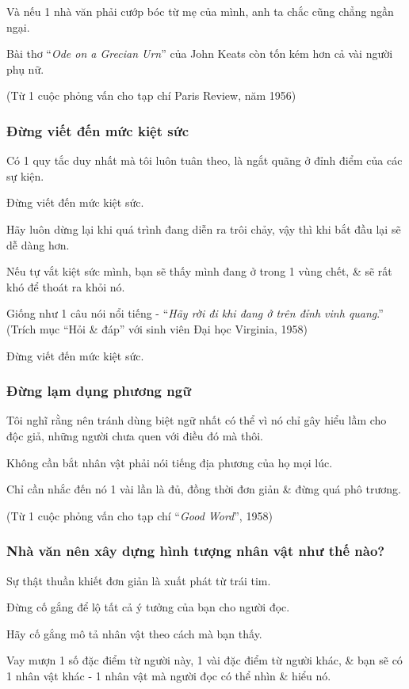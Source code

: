 \documentclass{article}
\begin{document}
Và nếu 1 nhà văn phải cướp bóc từ mẹ của mình, anh ta chắc cũng chẳng ngần ngại.

Bài thơ ``\textit{Ode on a Grecian Urn}'' của John Keats còn tốn kém hơn cả vài người phụ nữ.

(Từ 1 cuộc phỏng vấn cho tạp chí Paris Review, năm 1956)

\subsubsection{Đừng viết đến mức kiệt sức}
Có 1 quy tắc duy nhất mà tôi luôn tuân theo, là ngắt quãng ở đỉnh điểm của các sự kiện.

Đừng viết đến mức kiệt sức.

Hãy luôn dừng lại khi quá trình đang diễn ra trôi chảy, vậy thì khi bắt đầu lại sẽ dễ dàng hơn.

Nếu tự vắt kiệt sức mình, bạn sẽ thấy mình đang ở trong 1 vùng chết, \& sẽ rất khó để thoát ra khỏi nó.

Giống như 1 câu nói nổi tiếng - ``\textit{Hãy rời đi khi đang ở trên đỉnh vinh quang}.'' (Trích mục ``Hỏi \& đáp'' với sinh viên Đại học Virginia, 1958)

\textsf{Đừng viết đến mức kiệt sức.}

\subsubsection{Đừng lạm dụng phương ngữ}
Tôi nghĩ rằng nên tránh dùng biệt ngữ nhất có thể vì nó chỉ gây hiểu lầm cho độc giả, những người chưa quen với điều đó mà thôi.

Không cần bắt nhân vật phải nói tiếng địa phương của họ mọi lúc.

Chỉ cần nhắc đến nó 1 vài lần là đủ, đồng thời đơn giản \& đừng quá phô trương.

(Từ 1 cuộc phỏng vấn cho tạp chí ``\textit{Good Word}'', 1958)

\subsubsection{Nhà văn nên xây dựng hình tượng nhân vật như thế nào?}
Sự thật thuần khiết đơn giản là xuất phát từ trái tim.

Đừng cố gắng để lộ tất cả ý tưởng của bạn cho người đọc.

Hãy cố gắng mô tả nhân vật theo cách mà bạn thấy.

Vay mượn 1 số đặc điểm từ người này, 1 vài đặc điểm từ người khác, \& bạn sẽ có 1 nhân vật khác - 1 nhân vật mà người đọc có thể nhìn \& hiểu nó.
\end{document}
